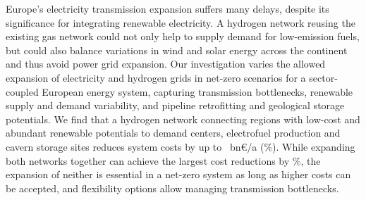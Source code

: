 Europe's electricity transmission expansion suffers many delays, despite its
significance for integrating renewable electricity. A hydrogen network reusing
the existing gas network could not only help to supply demand for low-emission
fuels, but could also balance variations in wind and solar energy across the
continent and thus avoid power grid expansion. Our investigation varies the
allowed expansion of electricity and hydrogen grids in net-zero \co scenarios
for a sector-coupled European energy system, capturing transmission bottlenecks,
renewable supply and demand variability, and pipeline retrofitting and
geological storage potentials. We find that a hydrogen network connecting
regions with low-cost and abundant renewable potentials to demand centers,
electrofuel production and cavern storage sites reduces system costs by up to
\maxhybenefitabs~bn\euro/a (\maxhybenefitrel\%). While expanding both networks
together can achieve the largest cost reductions by \gridbenefitrel\%, the
expansion of neither is essential in a net-zero system as long as higher costs
can be accepted, and flexibility options allow managing transmission
bottlenecks.
